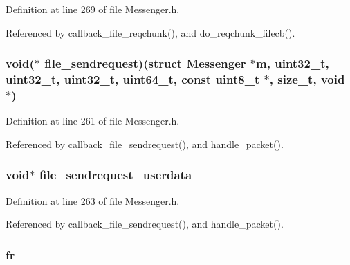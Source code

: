 Definition at line 269 of file Messenger.\+h.



Referenced by callback\+\_\+file\+\_\+reqchunk(), and do\+\_\+reqchunk\+\_\+filecb().

\hypertarget{struct_messenger_a1d83804ee0bfe9249fda05cdd755a37f}{
\subsubsection[{file\+\_\+sendrequest}]{\setlength{\rightskip}{0pt plus 5cm}void($\ast$ file\+\_\+sendrequest)(struct {\bf Messenger} $\ast${\bf m}, uint32\+\_\+t, uint32\+\_\+t, uint32\+\_\+t, uint64\+\_\+t, const uint8\+\_\+t $\ast$, size\+\_\+t, void $\ast$)}}\label{struct_messenger_a1d83804ee0bfe9249fda05cdd755a37f}


Definition at line 261 of file Messenger.\+h.



Referenced by callback\+\_\+file\+\_\+sendrequest(), and handle\+\_\+packet().

\hypertarget{struct_messenger_a26be37effc113183fae96f3a7279ebb0}{
\subsubsection[{file\+\_\+sendrequest\+\_\+userdata}]{\setlength{\rightskip}{0pt plus 5cm}void$\ast$ file\+\_\+sendrequest\+\_\+userdata}}\label{struct_messenger_a26be37effc113183fae96f3a7279ebb0}


Definition at line 263 of file Messenger.\+h.



Referenced by callback\+\_\+file\+\_\+sendrequest(), and handle\+\_\+packet().

\hypertarget{struct_messenger_ae46787dbb8f8dce47f8fdc6192cf788d}{
\subsubsection[{fr}]{ fr}}\label{struct_messenger_ae46787dbb8f8dce47f8fdc6192cf788d}


